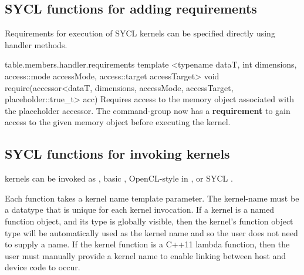 \subsection{SYCL functions for adding requirements}
\label{sub.section.requirement}

Requirements for execution of SYCL kernels can be specified directly using
handler methods.

{table.members.handler.requirements}
  \addRowFourSL
    { template <typename dataT, int dimensions, }
    { access::mode accessMode, access::target accessTarget> }
    { void require(accessor<dataT, dimensions, accessMode, accessTarget, }
    { placeholder::true_t> acc) }
    {
      Requires access to the memory object associated with the placeholder
      accessor. 
      The \gls{command-group} now has a \textbf{requirement} to gain access 
      to the given memory object before executing the kernel.
    }
\completeTable


\subsection{SYCL functions for invoking kernels}
\label{subsec:invokingkernels}

\Glspl{kernel} can be invoked as , basic
, OpenCL-style  in
, or SYCL .

Each function takes a kernel name template parameter. The \gls{kernel-name}
must be a datatype that is unique for each kernel invocation. If a
kernel is a named function object, and its type is globally visible,  then the
kernel's function object type will be automatically used as the kernel name and so the user does
not need to supply a name. If the kernel function is a C++11 lambda function,
then the user must manually provide a kernel name to enable linking
between host and device code to occur.

